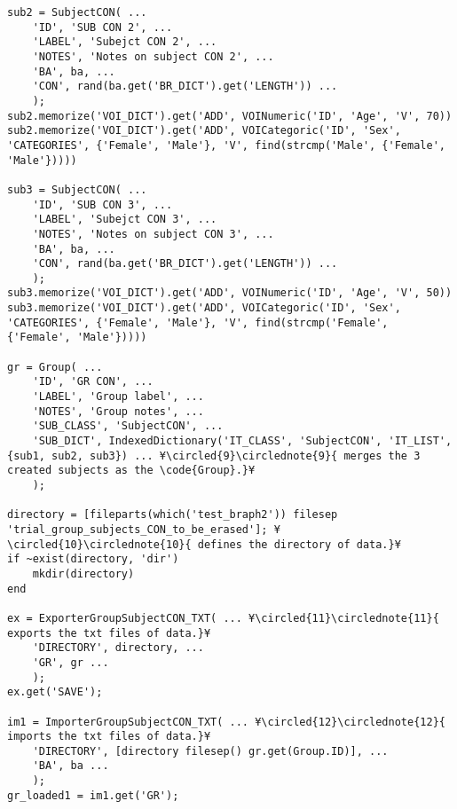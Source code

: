 \documentclass{tufte-handout}
\begin{document}
\begin{lstlisting}
sub2 = SubjectCON( ...
    'ID', 'SUB CON 2', ...
    'LABEL', 'Subejct CON 2', ...
    'NOTES', 'Notes on subject CON 2', ...
    'BA', ba, ...
    'CON', rand(ba.get('BR_DICT').get('LENGTH')) ...
    );
sub2.memorize('VOI_DICT').get('ADD', VOINumeric('ID', 'Age', 'V', 70))
sub2.memorize('VOI_DICT').get('ADD', VOICategoric('ID', 'Sex', 'CATEGORIES', {'Female', 'Male'}, 'V', find(strcmp('Male', {'Female', 'Male'}))))

sub3 = SubjectCON( ...
    'ID', 'SUB CON 3', ...
    'LABEL', 'Subejct CON 3', ...
    'NOTES', 'Notes on subject CON 3', ...
    'BA', ba, ...
    'CON', rand(ba.get('BR_DICT').get('LENGTH')) ...
    );
sub3.memorize('VOI_DICT').get('ADD', VOINumeric('ID', 'Age', 'V', 50))
sub3.memorize('VOI_DICT').get('ADD', VOICategoric('ID', 'Sex', 'CATEGORIES', {'Female', 'Male'}, 'V', find(strcmp('Female', {'Female', 'Male'}))))

gr = Group( ...
    'ID', 'GR CON', ...
    'LABEL', 'Group label', ...
    'NOTES', 'Group notes', ...
    'SUB_CLASS', 'SubjectCON', ...
    'SUB_DICT', IndexedDictionary('IT_CLASS', 'SubjectCON', 'IT_LIST', {sub1, sub2, sub3}) ... ¥\circled{9}\circlednote{9}{ merges the 3 created subjects as the \code{Group}.}¥
    );

directory = [fileparts(which('test_braph2')) filesep 'trial_group_subjects_CON_to_be_erased']; ¥\circled{10}\circlednote{10}{ defines the directory of data.}¥
if ~exist(directory, 'dir')
    mkdir(directory)
end

ex = ExporterGroupSubjectCON_TXT( ... ¥\circled{11}\circlednote{11}{ exports the txt files of data.}¥
    'DIRECTORY', directory, ...
    'GR', gr ...
    );
ex.get('SAVE');

im1 = ImporterGroupSubjectCON_TXT( ... ¥\circled{12}\circlednote{12}{ imports the txt files of data.}¥
    'DIRECTORY', [directory filesep() gr.get(Group.ID)], ...
    'BA', ba ...
    );
gr_loaded1 = im1.get('GR');


\end{lstlisting}
\end{document}

